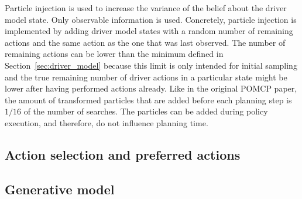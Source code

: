 Particle injection is used to increase the variance of the belief about the driver model state. Only observable information is used. Concretely, particle injection is implemented by adding driver model states with a random number of remaining actions and the same action as the one that was last observed. The number of remaining actions can be lower than the minimum defined in Section~\ref{sec:driver_model} because this limit is only intended for initial sampling and the true remaining number of driver actions in a particular state might be lower after having performed actions already. Like in the original POMCP paper, the amount of transformed particles that are added before each planning step is $1/16$ of the number of searches. The particles can be added during policy execution, and therefore, do not influence planning time.



\subsection{Action selection and preferred actions}
\label{sec:action_selection}




\subsection{Generative model}
\label{sec:gen_model}

